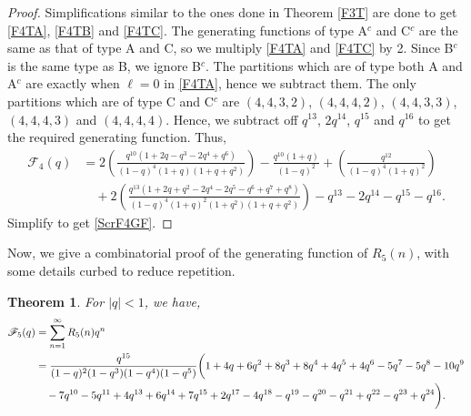 \documentclass[12pt,reqno]{amsart}
\numberwithin{equation}{section}
\theoremstyle{plain}
\newtheorem{theorem}{Theorem}[section]
\begin{document}
\begin{proof}
		Simplifications similar to the ones done in Theorem \ref{F3T} are done to get \eqref{F4TA}, \eqref{F4TB} and \eqref{F4TC}. The generating functions of type A$^c$ and C$^c$ are the same as that of type A and C, so we multiply \eqref{F4TA} and \eqref{F4TC} by 2. Since B$^c$ is the same type as B, we ignore B$^c$. The partitions which are of type both A and A$^c$ are exactly when $\ell=0$ in \eqref{F4TA}, hence we subtract them. The only partitions which are of type C and C$^c$ are $(4,4,3,2)$, $(4,4,4,2)$, $(4,4,3,3)$, $(4,4,4,3)$ and $(4,4,4,4)$. Hence, we subtract off $q^{13}$, $2q^{14}$, $q^{15}$ and $q^{16}$ to get the required generating function. Thus,
		\begin{align*}
			\mathscr{F}_4(q) &= 2 \left(  \frac{q^{10}(1+2q-q^3-2q^4+q^6)}{(1-q)^4(1+q)(1+q+q^2)} \right) - \frac{q^{10}(1+q)}{(1-q)^2} + \left( \frac{q^{12}}{(1-q)^4(1+q)^2} \right) \\
			& \quad +2 \left(  \frac{q^{13}(1+2q+q^2-2q^4-2q^5-q^6+q^7+q^8)}{(1-q)^4(1+q)^2(1+q^2)(1+q+q^2)} \right) - q^{13}-2q^{14} -q^{15} -q^{16}.
		\end{align*}
		Simplify to get \eqref{ScrF4GF}.
	\end{proof}
	Now, we give a combinatorial proof of the generating function of $R_5(n)$, with some details curbed to reduce repetition.
	\begin{theorem}\label{F5T}
		For $|q|<1$, we have,
		\begin{align}
			\mathscr{F}_5(q) &= \sum_{n=1}^{\infty} R_5(n) q^n \notag \\
			&= \frac{q^{15}}{(1-q)^2(1-q^3)(1-q^4)(1-q^5)}\bigg( 1+4q+6q^2+8q^3+8q^4+4q^5+4q^6-5q^7 -5q^8 -10q^9 \notag\\ 
			 &\quad   -7q^{10}-5q^{11}+4q^{13}+6q^{14}+7q^{15}+2q^{17} -4q^{18}-q^{19}-q^{20}-q^{21}+q^{22}-q^{23}+q^{24} \bigg). \label{ScrF5GF}
		\end{align}		
	\end{theorem}
\end{document}
